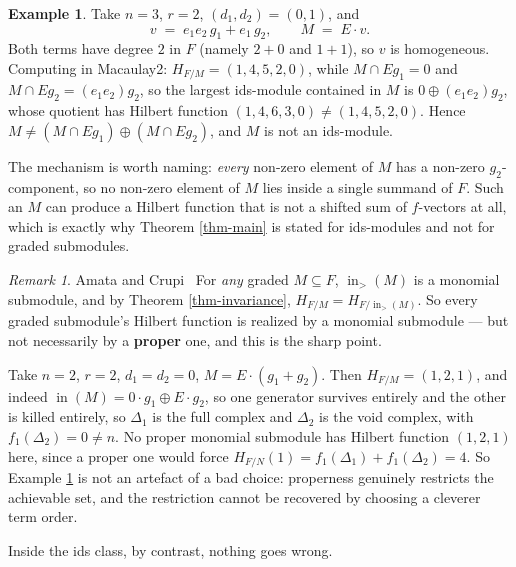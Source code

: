 \documentclass[11pt, a4paper, abstract=yes]{scrartcl}
\theoremstyle{definition}
\newtheorem{mexample}[definition]{Example}
\theoremstyle{remark}
\newtheorem{remark}[definition]{Remark}
\theoremstyle{plain}
\newcommand{\inn}{\operatorname{in}}
\begin{document}
\begin{mexample}
Take \(n=3\), \(r=2\), \((d_1,d_2)=(0,1)\), and
\begin{equation}\label{eq:nonids}
  v\;=\;e_1e_2\,g_1+e_1\,g_2,\qquad M\;=\;E\cdot v .
\end{equation}
Both terms have degree \(2\) in \(F\) (namely \(2+0\) and \(1+1\)), so \(v\) is homogeneous.
Computing in Macaulay2: \(H_{F/M}=(1,4,5,2,0)\), while \(M\cap Eg_1=0\) and
\(M\cap Eg_2=(e_1e_2)g_2\), so the largest ids-module contained in \(M\) is
\(0\oplus(e_1e_2)g_2\), whose quotient has Hilbert function \((1,4,6,3,0)\ne(1,4,5,2,0)\). Hence
\(M\ne(M\cap Eg_1)\oplus(M\cap Eg_2)\), and \(M\) is not an ids-module.
\label{ex-nonids}
\end{mexample}

The mechanism is worth naming: \emph{every} non-zero element of \(M\) has a non-zero \(g_2\)-component, so
no non-zero element of \(M\) lies inside a single summand of \(F\). Such an \(M\) can produce a
Hilbert function that is not a shifted sum of \(f\)-vectors at all, which is exactly why
Theorem \ref{thm-main} is stated for ids-modules and not for graded submodules.

\begin{remark}
Amata and Crupi~\cite{AmataCrupi2020KK,AmataCrupi2020} For \emph{any} graded \(M\subseteq F\), \(\inn_>(M)\) is a monomial
submodule, and by Theorem \ref{thm-invariance}, \(H_{F/M}=H_{F/\inn_>(M)}\). So every graded submodule's
Hilbert function is realized by a monomial submodule --- but not necessarily by a \textbf{proper} one, and
this is the sharp point.

Take \(n=2\), \(r=2\), \(d_1=d_2=0\), \(M=E\cdot(g_1+g_2)\). Then \(H_{F/M}=(1,2,1)\), and indeed
\(\inn(M)=0\cdot g_1\oplus E\cdot g_2\), so one generator survives entirely and the other is killed
entirely, so \(\Delta_1\) is the full complex and \(\Delta_2\) is the void complex, with
\(f_1(\Delta_2)=0\ne n\). No proper monomial submodule has Hilbert function \((1,2,1)\) here, since a
proper one would force \(H_{F/N}(1)=f_1(\Delta_1)+f_1(\Delta_2)=4\). So Example \ref{ex-nonids} is not an
artefact of a bad choice: properness genuinely restricts the achievable set, and the restriction
cannot be recovered by choosing a cleverer term order.
\label{rem-ac-reduction}
\end{remark}

Inside the ids class, by contrast, nothing goes wrong.
\end{document}
